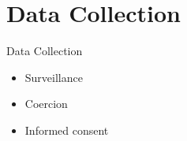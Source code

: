 \documentclass[main]{subfiles}
\begin{document}
\section{Data Collection}

\begin{frame}{Data Collection}
  \begin{itemize}
    \item Surveillance
    \item Coercion
    \item Informed consent
  \end{itemize}

\vspace{2em}

\centering
{}

\end{frame}
\end{document}

